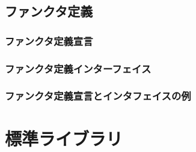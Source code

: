 \documentclass{jbook}
\newif\ifjp
\newcommand{\txt}[2]{#1}
\begin{document}
\section{\txt{ファンクタ定義}{}}
\ifjp%
\else%
\fi%

\subsection{\txt{ファンクタ定義宣言}{}}
\ifjp%
\else%
\fi%

\subsection{\txt{ファンクタ定義インターフェイス}{}}
\ifjp%
\else%
\fi%

\subsection{\txt{ファンクタ定義宣言とインタフェイスの例}{}}
\ifjp%
\else%
\fi%


% 
\chapter{\txt{標準ライブラリ}{The Basis Library}}
\end{document}

